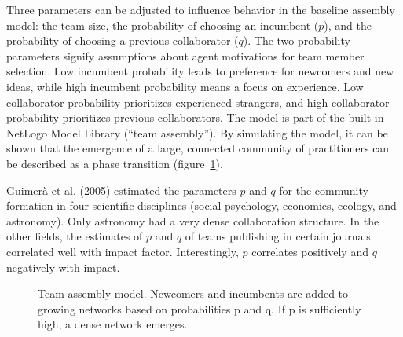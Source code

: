 \documentclass[
  a4paper,
  DIV=11,
  numbers=noendperiod,
  oneside]{scrreprt}
\begin{document}
Three parameters can be adjusted to influence behavior in the baseline
assembly model: the team size, the probability of choosing an incumbent
(\(p\)), and the probability of choosing a previous collaborator
(\(q\)). The two probability parameters signify assumptions about agent
motivations for team member selection. Low incumbent probability leads
to preference for newcomers and new ideas, while high incumbent
probability means a focus on experience. Low collaborator probability
prioritizes experienced strangers, and high collaborator probability
prioritizes previous collaborators. The model is part of the built-in
NetLogo Model Library (``team assembly''). By simulating the model, it
can be shown that the emergence of a large, connected community of
practitioners can be described as a phase transition
(figure~\ref{fig-ch5n-img10-old-48}).

Guimerà et al. (2005) estimated the parameters \(p\) and \(q\) for the
community formation in four scientific disciplines (social psychology,
economics, ecology, and astronomy). Only astronomy had a very dense
collaboration structure. In the other fields, the estimates of \(p\) and
\(q\) of teams publishing in certain journals correlated well with
impact factor. Interestingly, \(p\) correlates positively and \(q\)
negatively with impact.

\begin{figure}


\caption{\label{fig-ch5n-img10-old-48}Team assembly model. Newcomers and
incumbents are added to growing networks based on probabilities p and q.
If p is sufficiently high, a dense network emerges.}

\end{figure}%
\end{document}
